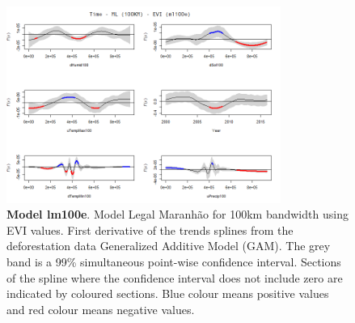 \begin{table}

\begin{figure}[H]
 \centering
        \centering
        \includegraphics[width=0.8\textwidth]{ml100e.png} %
        \caption[Model Legal Maranhão for 100km bandwidth using EVI values. First derivative of the trends splines from the deforestation data Generalized Additive Model (GAM)]{\textbf{Model lm100e}. Model Legal Maranhão for 100km bandwidth using EVI values. First derivative of the trends splines from the deforestation data Generalized Additive Model (GAM). The grey band is a 99\% simultaneous point-wise confidence interval. Sections of the spline where the confidence interval does not include zero are indicated by coloured sections. Blue colour means positive values and red colour means negative values.}
        \centering
\end{figure}
\end{table}


